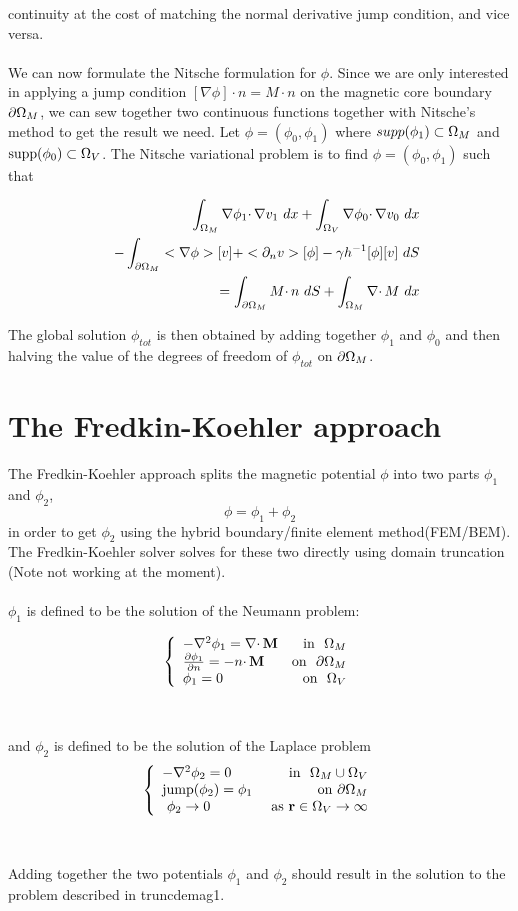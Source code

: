 \documentclass[12pt,a4paper,notitlepage]{article}
\begin{document}
continuity at the cost of matching the normal derivative jump condition, and vice versa.  
\\
\\
We can now formulate the Nitsche formulation for $\phi$. Since we are only interested in applying a jump condition
$ [\nabla \phi]  \cdotp n =  M \cdotp n $ on the magnetic core boundary $\partial \Omega_M$, we can sew together two continuous functions
together with Nitsche's method to get the result we need. Let $\phi = (\phi_0,\phi_1)$ where
$\\supp(\phi_1) \subset \Omega_M$ and $\operatorname{supp}(\phi_0) \subset \Omega_V$. The Nitsche variational problem is to find  $\phi = (\phi_0,\phi_1)$ such that

\begin{eqnarray*}
&&\int_{\Omega_M} \nabla \phi_1 \cdotp \nabla v_1 \ dx + \int_{\Omega_V} \nabla \phi_0 \cdotp \nabla v_0 \ dx \\
&&- \int_{\partial \Omega_M} <\nabla \phi> [v]  + <\partial_n v> [\phi] - \gamma h^{-1} [\phi][v] \ dS \\
&&= \int_{\partial \Omega_M} M  \cdotp n \ dS + \int_{\Omega_M} \nabla \cdotp M \ dx
\end{eqnarray*}

The global solution $\phi_{tot}$ is then obtained by adding together $\phi_1$ and $\phi_0$ and then halving the value
of the degrees of freedom of $\phi_{tot}$ on $\partial \Omega_M$.


\section{The Fredkin-Koehler approach} 
The Fredkin-Koehler approach splits the magnetic potential $\phi$ into two parts $\phi_1$ and $\phi_2$, 
\[ \phi = \phi_1 + \phi_2 \]
\noindent in order to get $\phi_2$ using the hybrid boundary/finite element method(FEM/BEM).
The Fredkin-Koehler solver solves for these two directly using domain truncation (Note not working at the moment).
\\
\\
\noindent $\phi_1$ is defined to be the solution of the Neumann problem:

\[ 
\left\{
\begin{array}{lr}
- \nabla^2 \phi_1 = \nabla \cdotp \mathbf{M}  & \mbox{in } \ \Omega_M \\
 \frac{\partial \phi_1}{\partial n}  = -n \cdotp \mathbf{M} & \mbox{on } \  \partial \Omega_M \\
 \phi_1 = 0 & \mbox{on} \ \ \Omega_V
\end{array}
\right. 
\]
\\
\\
\noindent and $\phi_2$ is defined to be the solution of the Laplace problem
\[ 
\left\{
\begin{array}{lr}
- \nabla^2 \phi_2 = 0 & \mbox{in } \ \Omega_M \cup \Omega_V \\
\mbox{jump}(\phi_2) = \phi_1 & \mbox{on} \ \partial \Omega_M \\
\ \phi_2 \rightarrow 0 & \ \mbox{as} \ \mathbf{r} \in \Omega_V \rightarrow \infty
\end{array}
\right. 
\]
\\
\\
\noindent Adding together the two potentials $\phi_1$ and $\phi_2$ should result in the solution to the problem described in
truncdemag1. 
\end{document}
